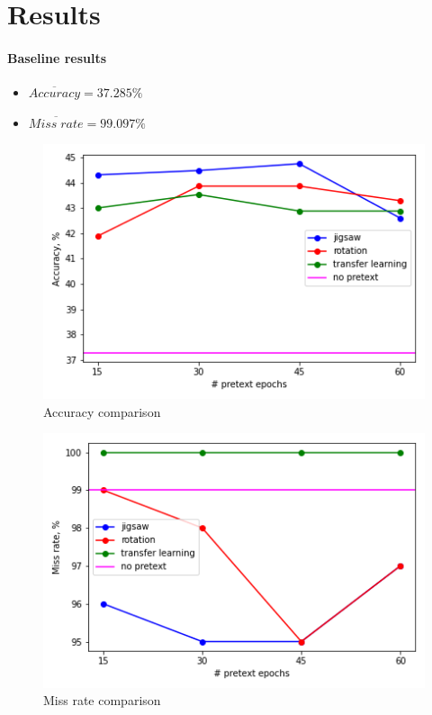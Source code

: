 \section{Results}

\paragraph{Baseline results}
\begin{itemize}
    \item  $\overline{Accuracy} = 37.285  \%$
    \item  $\overline{Miss \; rate} = 99.097 \%$
\end{itemize}


\begin{figure}
    \includegraphics{images/acc}
    \caption{\label{fig:figure-1}Accuracy comparison}
\end{figure}

\begin{figure}
    \includegraphics{images/miss}
    \caption{\label{fig:figure-2}Miss rate comparison}
\end{figure}



